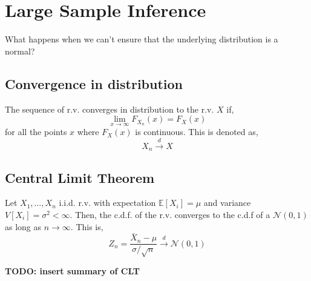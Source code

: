 \section{Large Sample Inference}
What happens when we can't ensure that the underlying distribution is a normal?

\subsection{Convergence in distribution}
The sequence of r.v. converges in distribution to the r.v. $X$ if,
\[ \lim_{x\rightarrow\infty}F_{X_n}(x) = F_X(x) \]
for all the points $x$ where $F_X(x)$ is continuous. This is denoted as,
\[ X_n \xrightarrow{d} X \]  

\subsection{Central Limit Theorem}
Let $X_1,\dots,X_n$ i.i.d. r.v. with expectation $\mathbb{E}[X_i] = \mu$ and variance $V[X_i]=\sigma^2 < \infty$. Then, the c.d.f. of the r.v. converges to the c.d.f 
of a $\mathcal{N}(0,1)$ as long as $n \rightarrow \infty$. This is,
\[ Z_n = \frac{\bar{X}_n - \mu}{\sigma/\sqrt{n}} \xrightarrow{d} \mathcal{N}(0,1)\]


\textbf{TODO: insert summary of CLT}













